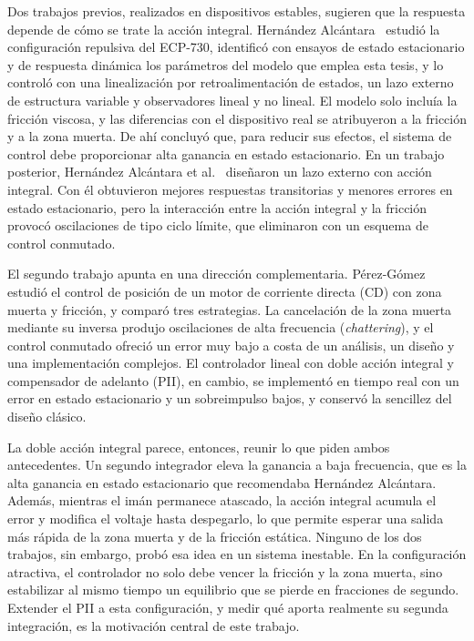 Dos trabajos previos, realizados en dispositivos estables, sugieren que la respuesta depende de cómo se trate la acción integral. Hernández Alcántara~\cite{diana_tesis} estudió la configuración repulsiva del ECP-730, identificó con ensayos de estado estacionario y de respuesta dinámica los parámetros del modelo que emplea esta tesis, y lo controló con una linealización por retroalimentación de estados, un lazo externo de estructura variable y observadores lineal y no lineal. El modelo solo incluía la fricción viscosa, y las diferencias con el dispositivo real se atribuyeron a la fricción y a la zona muerta. De ahí concluyó que, para reducir sus efectos, el sistema de control debe proporcionar alta ganancia en estado estacionario. En un trabajo posterior, Hernández Alcántara et al.~\cite{alcantara} diseñaron un lazo externo con acción integral. Con él obtuvieron mejores respuestas transitorias y menores errores en estado estacionario, pero la interacción entre la acción integral y la fricción provocó oscilaciones de tipo ciclo límite, que eliminaron con un esquema de control conmutado.

El segundo trabajo apunta en una dirección complementaria. Pérez-Gómez~\cite{perez} estudió el control de posición de un motor de corriente directa (CD) con zona muerta y fricción, y comparó tres estrategias. La cancelación de la zona muerta mediante su inversa produjo oscilaciones de alta frecuencia (\emph{chattering}), y el control conmutado ofreció un error muy bajo a costa de un análisis, un diseño y una implementación complejos. El controlador lineal con doble acción integral y compensador de adelanto (PII), en cambio, se implementó en tiempo real con un error en estado estacionario y un sobreimpulso bajos, y conservó la sencillez del diseño clásico.

La doble acción integral parece, entonces, reunir lo que piden ambos antecedentes. Un segundo integrador eleva la ganancia a baja frecuencia, que es la alta ganancia en estado estacionario que recomendaba Hernández Alcántara. Además, mientras el imán permanece atascado, la acción integral acumula el error y modifica el voltaje hasta despegarlo, lo que permite esperar una salida más rápida de la zona muerta y de la fricción estática. Ninguno de los dos trabajos, sin embargo, probó esa idea en un sistema inestable. En la configuración atractiva, el controlador no solo debe vencer la fricción y la zona muerta, sino estabilizar al mismo tiempo un equilibrio que se pierde en fracciones de segundo. Extender el PII a esta configuración, y medir qué aporta realmente su segunda integración, es la motivación central de este trabajo.

